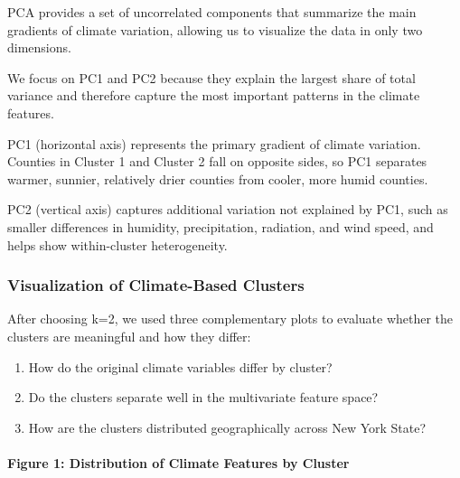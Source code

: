 \documentclass[
]{article}
\begin{document}
PCA provides a set of uncorrelated components that summarize the main
gradients of climate variation, allowing us to visualize the data in
only two dimensions.

We focus on PC1 and PC2 because they explain the largest share of total
variance and therefore capture the most important patterns in the
climate features.

PC1 (horizontal axis) represents the primary gradient of climate
variation. Counties in Cluster 1 and Cluster 2 fall on opposite sides,
so PC1 separates warmer, sunnier, relatively drier counties from cooler,
more humid counties.

PC2 (vertical axis) captures additional variation not explained by PC1,
such as smaller differences in humidity, precipitation, radiation, and
wind speed, and helps show within-cluster heterogeneity.

\subsubsection{Visualization of Climate-Based
Clusters}\label{visualization-of-climate-based-clusters}

After choosing k=2, we used three complementary plots to evaluate
whether the clusters are meaningful and how they differ:

\begin{enumerate}
\def\labelenumi{\arabic{enumi}.}
\item
  How do the original climate variables differ by cluster?
\item
  Do the clusters separate well in the multivariate feature space?
\item
  How are the clusters distributed geographically across New York State?
\end{enumerate}

\paragraph{Figure 1: Distribution of Climate Features by
Cluster}\label{figure-1-distribution-of-climate-features-by-cluster}
\end{document}
